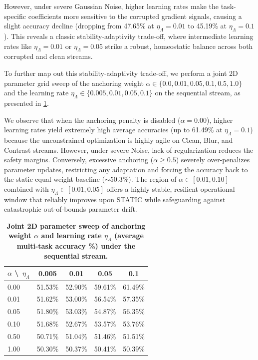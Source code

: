 \documentclass{article}
\theoremstyle{plain}
\theoremstyle{definition}
\theoremstyle{remark}
\begin{document}
However, under severe Gaussian Noise, higher learning rates make the task-specific coefficients more sensitive to the corrupted gradient signals, causing a slight accuracy decline (dropping from 47.65\% at $\eta_{\Lambda} = 0.01$ to 45.19\% at $\eta_{\Lambda} = 0.1$). This reveals a classic stability-adaptivity trade-off, where intermediate learning rates like $\eta_{\Lambda} = 0.01$ or $\eta_{\Lambda} = 0.05$ strike a robust, homeostatic balance across both corrupted and clean streams.

To further map out this stability-adaptivity trade-off, we perform a joint 2D parameter grid sweep of the anchoring weight $\alpha \in \{0.0, 0.01, 0.05, 0.1, 0.5, 1.0\}$ and the learning rate $\eta_{\Lambda} \in \{0.005, 0.01, 0.05, 0.1\}$ on the sequential stream, as presented in \cref{table:grid_sweep}. 

We observe that when the anchoring penalty is disabled ($\alpha = 0.00$), higher learning rates yield extremely high average accuracies (up to 61.49\% at $\eta_{\Lambda}=0.1$) because the unconstrained optimization is highly agile on Clean, Blur, and Contrast streams. However, under severe Noise, lack of regularization reduces the safety margins. Conversely, excessive anchoring ($\alpha \ge 0.5$) severely over-penalizes parameter updates, restricting any adaptation and forcing the accuracy back to the static equal-weight baseline ($\sim$50.3\%). The region of $\alpha \in [0.01, 0.10]$ combined with $\eta_{\Lambda} \in [0.01, 0.05]$ offers a highly stable, resilient operational window that reliably improves upon STATIC while safeguarding against catastrophic out-of-bounds parameter drift.

\begin{table}[t]
\caption{\textbf{Joint 2D parameter sweep of anchoring weight $\alpha$ and learning rate $\eta_{\Lambda}$ (average multi-task accuracy \%) under the sequential stream.}}
\label{table:grid_sweep}
\vskip 0.15in
\begin{center}
\begin{small}
\begin{sc}
\begin{tabular}{lcccc}
\toprule
$\alpha$ \textbackslash \, $\eta_{\Lambda}$ & 0.005 & 0.01 & 0.05 & 0.1 \\
\midrule
0.00 & 51.53\% & 52.90\% & 59.61\% & 61.49\% \\
0.01 & 51.62\% & 53.00\% & 56.54\% & 57.35\% \\
0.05 & 51.80\% & 53.03\% & 54.87\% & 56.35\% \\
0.10 & 51.68\% & 52.67\% & 53.57\% & 53.76\% \\
0.50 & 50.71\% & 51.04\% & 51.46\% & 51.51\% \\
1.00 & 50.30\% & 50.37\% & 50.41\% & 50.39\% \\
\bottomrule
\end{tabular}
\end{sc}
\end{small}
\end{center}
\vskip -0.1in
\end{table}
\end{document}
